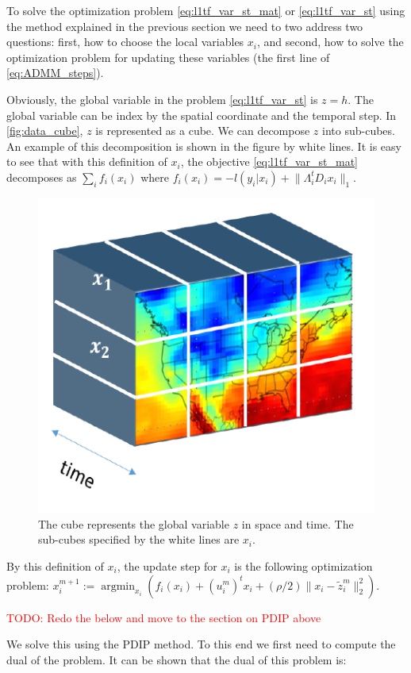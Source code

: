 \documentclass{article}
\DeclareMathOperator*{\argmin}{argmin}
\newcommand{\attn}[1]{\textcolor{red}{TODO: #1}}
\begin{document}
To solve the optimization problem \eqref{eq:l1tf_var_st_mat} or \eqref{eq:l1tf_var_st} using the method explained in the previous section we need to two address two questions: first, how to choose the local variables $x_i$, and second, how to solve the optimization problem for updating these variables (the first line of \eqref{eq:ADMM_steps}). 

Obviously, the global variable in the problem \eqref{eq:l1tf_var_st} is $z=h$. The global variable can be index by the spatial coordinate and the temporal step. In \autoref{fig:data_cube}, $z$ is represented as a cube. We can decompose $z$ into sub-cubes. An example of this decomposition is shown in the figure by white lines. It is easy to see that with this definition of $x_i$, the objective \eqref{eq:l1tf_var_st_mat} decomposes as $\sum_i f_i(x_i)$ where $f_i(x_i)=-l(y_i|x_i)+\lVert \Lambda_i^t D_ix_i \lVert_1$. 


\begin{figure}[tb]
	\vskip 0.2in
	\begin{center}
		\centerline{\includegraphics[width=.5\columnwidth]{Figures/data_cube}}
		\caption{The cube represents the global variable $z$ in space and time. The sub-cubes specified by the white lines are $x_i$.}
		\label{fig:data_cube}
	\end{center}
	\vskip -0.2in
\end{figure} 

By this definition of $x_i$, the update step for $x_i$ is the following optimization problem: $x_i^{m+1}:=\argmin_{x_i} ( f_i(x_i) + (u_i^m)^t x_i + (\rho/2) \lVert x_i-\tilde{z}_i^m \lVert_2^2)$.

\attn{Redo the below and move to the section on PDIP above}

We solve this using the PDIP method. To this end we first need to compute the dual of the problem. It can be shown that the dual of this problem is:
\end{document}
